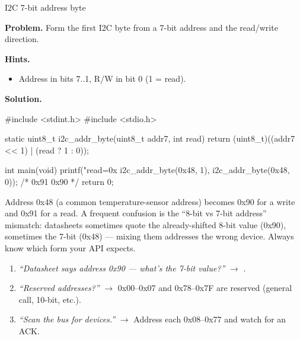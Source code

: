 \begin{gymproblem}{I2C 7-bit address byte}

\textbf{Problem.} Form the first I2C byte from a 7-bit address and the
read/write direction.

\textbf{Hints.}
\begin{itemize}
\item Address in bits 7..1, R/W in bit 0 (1 = read).
\end{itemize}

\attempt

\textbf{Solution.}
\begin{cgym}
#include <stdint.h>
#include <stdio.h>

static uint8_t i2c_addr_byte(uint8_t addr7, int read) {
    return (uint8_t)((addr7 << 1) | (read ? 1 : 0));
}

int main(void) {
    printf("read=0x%
           i2c_addr_byte(0x48, 1), i2c_addr_byte(0x48, 0));   /* 0x91 0x90 */
    return 0;
}
\end{cgym}

Address 0x48 (a common temperature-sensor address) becomes 0x90 for a write and
0x91 for a read. A frequent confusion is the ``8-bit vs 7-bit address''
mismatch: datasheets sometimes quote the already-shifted 8-bit value (0x90),
sometimes the 7-bit (0x48) --- mixing them addresses the wrong device. Always
know which form your API expects.

\followups
\begin{enumerate}
\item \emph{``Datasheet says address 0x90 --- what's the 7-bit value?''}
  $\rightarrow$ .
\item \emph{``Reserved addresses?''} $\rightarrow$ 0x00--0x07 and 0x78--0x7F are
  reserved (general call, 10-bit, etc.).
\item \emph{``Scan the bus for devices.''} $\rightarrow$ Address each 0x08--0x77
  and watch for an ACK.
\end{enumerate}
\end{gymproblem}

